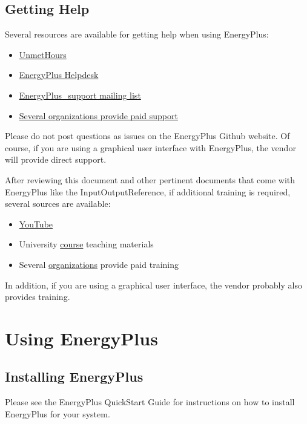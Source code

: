 \section{Getting Help \label{subsec:Getting-Help}}

Several resources are available for getting help when using EnergyPlus:
\begin{itemize}
\item \href{https://unmethours.com/questions/}{UnmetHours}
\item \href{https://energyplushelp.freshdesk.com/}{EnergyPlus Helpdesk}
\item \href{https://groups.yahoo.com/neo/groups/EnergyPlus_Support/info}{EnergyPlus\_support mailing list}
\item \href{https://buildingenergysoftwaretools.com/?capabilities=Support+Services&keys=EnergyPlus}{Several organizations provide paid support}
\end{itemize}
Please do not post questions as issues on the EnergyPlus Github website.
Of course, if you are using a graphical user interface with EnergyPlus,
the vendor will provide direct support.

After reviewing this document and other pertinent documents that come
with EnergyPlus like the InputOutputReference, if additional training
is required, several sources are available:
\begin{itemize}
\item \href{https://www.youtube.com/results?search_query=energyplus}{YouTube}
\item University \href{https://energyplus.net/support}{course} teaching
materials
\item Several \href{https://www.buildingenergysoftwaretools.com/?capabilities=Training+Services&keys=EnergyPlus}{organizations}
provide paid training
\end{itemize}
In addition, if you are using a graphical user interface, the vendor
probably also provides training.

\chapter{Using EnergyPlus \label{sec:Using-EnergyPlus}}

\section{Installing EnergyPlus}

Please see the EnergyPlus QuickStart Guide for instructions on how
to install EnergyPlus for your system.

